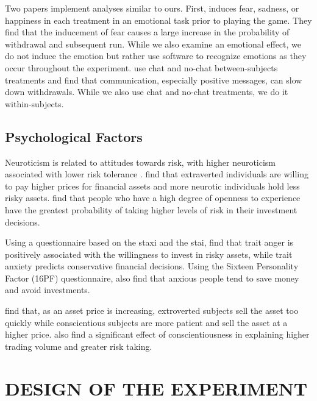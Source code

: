 \documentclass[thesis]{uathesis}
\begin{document}
\begin{body}
Two papers implement analyses similar to ours. First, \cite{dijk2017bank} induces fear, sadness, or happiness in each treatment in an emotional task prior to playing the game. They find that the inducement of fear causes a large increase in the probability of withdrawal and subsequent run. While we also examine an emotional effect, we do not induce the emotion but rather use software to recognize emotions as they occur throughout the experiment. \cite{shakina2018coordination} use chat and no-chat between-subjects treatments and find that communication, especially positive messages, can slow down withdrawals. While we also use chat and no-chat treatments, we do it within-subjects.



\section{Psychological Factors}



Neuroticism is related to attitudes towards risk, with higher neuroticism associated with lower risk tolerance \citep{rustichini2016toward}.  \cite{oehler2018investors} find that extraverted individuals are willing to pay higher prices for financial assets and more neurotic individuals hold less risky assets. \cite{de2019personality} find that people who have a high degree of openness to experience have the greatest probability of taking higher levels of risk in their investment decisions.



Using a questionnaire based on the \gls{staxi} and the \gls{stai}, \cite{gambetti2012effect} find that trait anger is positively associated with the willingness to invest in risky assets, while trait anxiety predicts conservative financial decisions. Using the Sixteen Personality Factor (16PF) questionnaire, \cite{gambetti2019personality} also find that anxious people tend to save money and avoid investments.



\cite{cecchini2019individual}  find that, as an asset price is increasing,  extroverted subjects sell the asset too quickly while conscientious subjects are more patient and sell the asset at a higher price. \cite{bajo2023psychological} also find a significant effect of  conscientiousness in explaining higher trading volume and greater risk taking.


\chapter{DESIGN OF THE EXPERIMENT}


\end{body}
\end{document}

